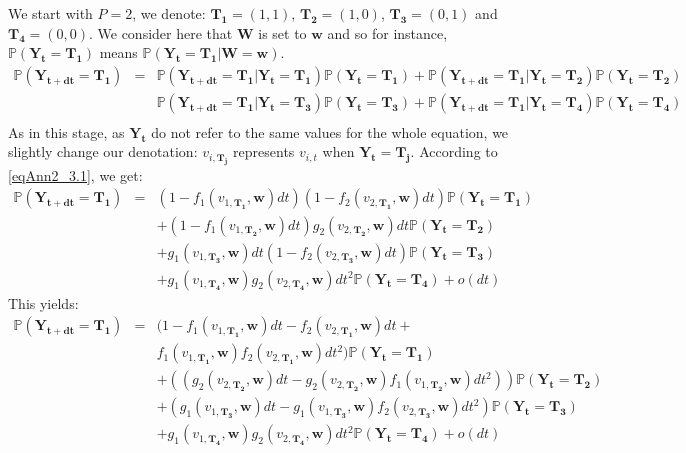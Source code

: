 We start with $P=2$, we denote: $\mathbf{T_1}=(1,1)$, $\mathbf{T_2}=(1,0)$, $\mathbf{T_3}=(0,1)$ and $\mathbf{T_4}=(0,0)$. We consider here that $\mathbf{W}$ is set to $\mathbf{w}$ and so for instance, $\mathbb{P}(\mathbf{\mathbf{Y_t}}=\mathbf{T_1})$ means $\mathbb{P}(\mathbf{\mathbf{Y_t}}=\mathbf{T_1}|\mathbf{W}=\mathbf{w})$.
\begin{eqnarray}
\nonumber \mathbb{P}(\mathbf{Y_{t+dt}}=\mathbf{T_1})&=&\mathbb{P}(\mathbf{Y_{t+dt}}=\mathbf{T_1}|\mathbf{Y_t}=\mathbf{T_1})\mathbb{P}(\mathbf{Y_t}=\mathbf{T_1})+\mathbb{P}(\mathbf{Y_{t+dt}}=\mathbf{T_1}|\mathbf{Y_t}=\mathbf{T_2})\mathbb{P}(\mathbf{Y_t}=\mathbf{T_2}) \\
& &
\nonumber \mathbb{P}(\mathbf{Y_{t+dt}}=\mathbf{T_1}|\mathbf{Y_t}=\mathbf{T_3})\mathbb{P}(\mathbf{Y_t}=\mathbf{T_3})+\mathbb{P}(\mathbf{Y_{t+dt}}=\mathbf{T_1}|\mathbf{Y_t}=\mathbf{T_4})\mathbb{P}(\mathbf{Y_t}=\mathbf{T_4}) \\
& &
\label{eqAnn2_5.1}
\end{eqnarray}
As in this stage, as $\mathbf{Y_t}$ do not refer to the same values for the whole equation, we slightly change our denotation: $v_{i,\mathbf{T_j}}$ represents $v_{i,t}$ when $\mathbf{Y_t}=\mathbf{T_j}$. According to \eqref{eqAnn2_3.1}, we get:
\begin{eqnarray}
\label{eqAnn2_5.2} \nonumber  \mathbb{P}(\mathbf{Y_{t+dt}}=\mathbf{T_1})&=&(1-f_1(v_{1,\mathbf{T_1}},\mathbf{w})dt)(1-f_2(v_{2,\mathbf{T_1}},\mathbf{w})dt)\mathbb{P}(\mathbf{Y_t}=\mathbf{T_1})\\
\nonumber & & +(1-f_1(v_{1,\mathbf{T_2}},\mathbf{w})dt)g_2(v_{2,\mathbf{T_2}},\mathbf{w})dt \mathbb{P}(\mathbf{Y_t}=\mathbf{T_2}) \\
\nonumber & & +g_1(v_{1,\mathbf{T_3}},\mathbf{w})dt(1-f_2(v_{2,\mathbf{T_3}},\mathbf{w})dt)\mathbb{P}(\mathbf{Y_t}=\mathbf{T_3}) \\
\label{eqAnn2_5.2} & & +g_1(v_{1,\mathbf{T_4}},\mathbf{w})g_2(v_{2,\mathbf{T_4}},\mathbf{w})dt^2\mathbb{P}(\mathbf{Y_t}=\mathbf{T_4}) +o(dt)
\end{eqnarray}
This yields:
\begin{eqnarray}
\label{eqAnn2_5.3} \nonumber \mathbb{P}(\mathbf{Y_{t+dt}}=\mathbf{T_1})&=&(1-f_1(v_{1,\mathbf{T_1}},\mathbf{w})dt-f_2(v_{2,\mathbf{T_1}},\mathbf{w})dt+ \\
\nonumber & & f_1(v_{1,\mathbf{T_1}},\mathbf{w})f_2(v_{2,\mathbf{T_1}},\mathbf{w})dt^2)\mathbb{P}(\mathbf{Y_t}=\mathbf{T_1})\\
\nonumber & & +((g_2(v_{2,\mathbf{T_2}},\mathbf{w})dt-g_2(v_{2,\mathbf{T_2}},\mathbf{w})f_1(v_{1,\mathbf{T_2}},\mathbf{w})dt^2))\mathbb{P}(\mathbf{Y_t}=\mathbf{T_2}) \\
\nonumber & & +(g_1(v_{1,\mathbf{T_3}},\mathbf{w})dt-g_1(v_{1,\mathbf{T_3}},\mathbf{w})f_2(v_{2,\mathbf{T_3}},\mathbf{w})dt^2)\mathbb{P}(\mathbf{Y_t}=\mathbf{T_3}) \\
& & +g_1(v_{1,\mathbf{T_4}},\mathbf{w})g_2(v_{2,\mathbf{T_4}},\mathbf{w})dt^2\mathbb{P}(\mathbf{Y_t}=\mathbf{T_4})+o(dt)
\end{eqnarray}
